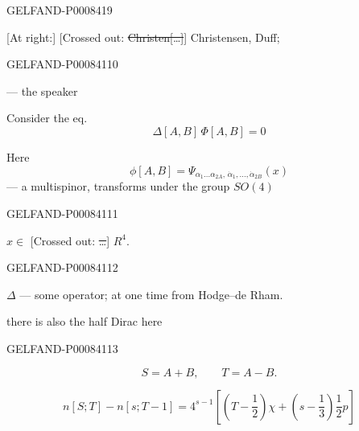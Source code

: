 \begin{GelfandAdjacentEvidence}{GELFAND-P000841}{9}



[At right:] [Crossed out: \sout{Christen[…]}] Christensen, Duff;
\end{GelfandAdjacentEvidence}
\begin{GelfandAdjacentEvidence}{GELFAND-P000841}{10}


 — the speaker

Consider the eq.
\begin{equation*}
\Delta[A,B]\,\Phi[A,B]=0 \tag{1}
\end{equation*}

Here
\[
\phi[A,B]=\Psi_{\alpha_1\ldots\alpha_{2A},\,\dot\alpha_1,\ldots,\dot\alpha_{2B}}(x)
\]
— a multispinor, transforms under the group \(SO(4)\)
\end{GelfandAdjacentEvidence}
\begin{GelfandAdjacentEvidence}{GELFAND-P000841}{11}


\(x\in\) [Crossed out: \sout{…}] \(R^4\).
\end{GelfandAdjacentEvidence}
\begin{GelfandAdjacentEvidence}{GELFAND-P000841}{12}


\(\Delta\) — some operator; at one time from Hodge–de Rham.

there is also the half Dirac here
\end{GelfandAdjacentEvidence}
\begin{GelfandAdjacentEvidence}{GELFAND-P000841}{13}


\[
S=A+B,\qquad T=A-B.
\]

\begin{equation*}
n[S;T]-n[s;T-1]=4^{s-1}\left[\left(T-\frac12\right)\chi+\left(s-\frac13\right)\frac12p\right]
\tag{2}
\end{equation*}
\end{GelfandAdjacentEvidence}


